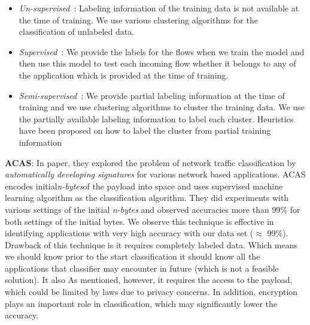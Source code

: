 \documentclass[conference]{IEEEtran}
\begin{document}
\begin{itemize} \itemsep3pt \parskip3pt 
	\item \emph{Un-supervised}~\cite{}:
	Labeling information of the training data is not available at the time of training. We use various clustering algorithms for the classification of unlabeled data\cite{}.
	\item \emph{Supervised}~\cite{}:
	We provide the labels for the flows when we train the model and then use this model to test each incoming flow whether it belongs to any of the application which is provided at the time of training\cite{}.
	\item \emph{Semi-supervised}~\cite{}: 
	We provide partial labeling information at the time of training and we use clustering algorithms to cluster the training data. We use the partially available labeling information to label each cluster. Heuristics have been proposed on how to label the cluster from partial training information\cite{}
\end{itemize}


\textbf{ACAS}\cite{ACAS}: In paper\cite{ACAS}, they explored the problem of network traffic classification by \emph{automatically developing signatures} for various network based applications. ACAS encodes initial\textit{n-bytes}of the payload into space and uses supervised machine learning algorithm as the classification algorithm. They did experiments with various settings of the initial \textit{n-bytes} and observed accuracies more than $99\%$ for both settings of the initial bytes. 
We observe this technique is effective in identifying applications with very high accuracy with our data set ($\approx$ 99\%). Drawback of this technique is it requires completely labeled data. Which means we should know prior to the start classification it should know all the applications that classifier may encounter in future (which is not a feasible solution). It also 
As mentioned, however, it requires the access to the payload, which could be limited by laws due to privacy concerns. In addition, encryption plays an important role in classification, which may significantly lower the accuracy.
\end{document}
